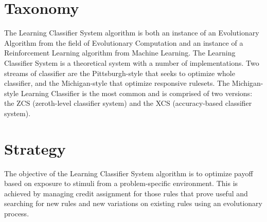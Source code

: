 \documentclass[a4paper, 11pt]{article}
\begin{document}
\section{Taxonomy}
\label{sec:taxonomy}
The Learning Classifier System algorithm is both an instance of an Evolutionary Algorithm from the field of Evolutionary Computation and an instance of a Reinforcement Learning algorithm from Machine Learning.
The Learning Classifier System is a theoretical system with a number of implementations. Two streams of classifier are the Pittsburgh-style that seeks to optimize whole classifier, and the Michigan-style that optimize responsive rulesets. 
The Michigan-style Learning Classifier is the most common and is comprised of two versions: the ZCS (zeroth-level classifier system) and the XCS (accuracy-based classifier system).

\section{Strategy}
\label{sec:strategy}
The objective of the Learning Classifier System algorithm is to optimize payoff based on exposure to stimuli from a problem-specific environment.
This is achieved by managing credit assignment for those rules that prove useful and searching for new rules and new variations on existing rules using an evolutionary process.
\end{document}
